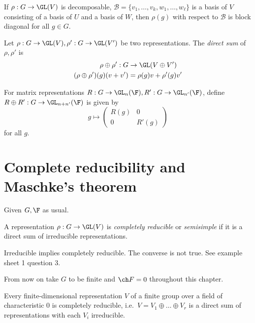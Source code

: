 \documentclass[a4paper]{article}
\begin{document}
\begin{lemma}
  If \(\rho: G \to \GL(V)\) is decomposable, \(\mathcal B = \{v_1, \dots, v_k, w_1, \dots, w_\ell\}\) is a basis of \(V\) consisting of a basis of \(U\) and a basis of \(W\), then \(\rho(g)\) with respect to \(\mathcal B\) is block diagonal for all \(g \in G\).
\end{lemma}

\begin{definition}
  Let \(\rho: G \to \GL(V), \rho': G \to \GL(V')\) be two representations. The \emph{direct sum} of \(\rho, \rho'\) is
  \begin{align*}
    \rho \oplus \rho': G &\to \GL(V \oplus V') \\
    (\rho \oplus \rho') (g) (v + v') &= \rho(g) v + \rho'(g) v'
  \end{align*}

  For matrix representations \(R: G \to \GL_n(\F), R': G \to \GL_{n'}(\F)\), define \(R \oplus R': G \to \GL_{n + n'}(\F)\) is given by
  \[
    g \mapsto
    \begin{pmatrix}
      R(g) & 0 \\
      0 & R'(g)
    \end{pmatrix}
  \]
  for all \(g\).
\end{definition}

\section{Complete reducibility and Maschke's theorem}

Given \(G, \F\) as usual.

\begin{definition}
  A representation \(\rho: G \to \GL(V)\) is \emph{completely reducible} or \emph{semisimple} if it is a direct sum of irreducible representations.
\end{definition}

\begin{remark}
  Irreducible implies completely reducible. The converse is not true. See example sheet 1 question 3.
\end{remark}

From now on take \(G\) to be finite and \(\ch F = 0\) throughout this chapter.

\begin{theorem}
  \label{thm:complete reducibility theorem}
  Every finite-dimensional representation \(V\) of a finite group over a field of characteristic \(0\) is completely reducible, i.e.\ \(V = V_1 \oplus \dots \oplus V_r\) is a direct sum of representations with each \(V_i\) irreducible.
\end{theorem}
\end{document}

